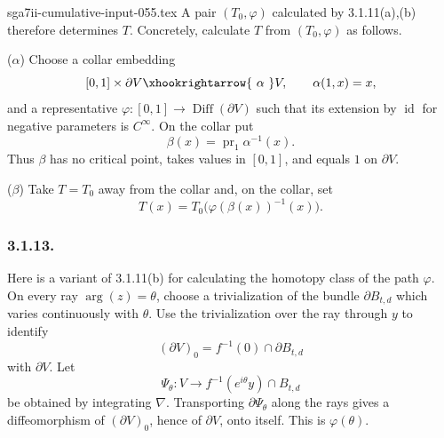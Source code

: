 \begin{filecontents*}{sga7ii-cumulative-input-055.tex}
A pair $(T_0,\varphi)$ calculated by 3.1.11(a),(b) therefore
determines $T$.  Concretely, calculate $T$ from $(T_0,\varphi)$ as
follows.

\medskip
\noindent\textup{($\alpha$)} Choose a collar embedding
  \[
  [0,1]\times\partial V\xhookrightarrow{\ \alpha\ }V,
  \qquad \alpha(1,x)=x,
  \]
  and a representative
  $\varphi:[0,1]\to\operatorname{Diff}(\partial V)$ such that its
  extension by $\operatorname{id}$ for negative parameters is
  $C^\infty$.  On the collar put
  \[
  \beta(x)=\operatorname{pr}_1\alpha^{-1}(x).
  \]
  Thus $\beta$ has no critical point, takes values in $[0,1]$, and
  equals $1$ on $\partial V$.

\medskip
\noindent\textup{($\beta$)} Take $T=T_0$ away from the collar and, on the collar, set
  \[
  T(x)=T_0\bigl(\varphi(\beta(x))^{-1}(x)\bigr).
  \]

\subsubsection*{3.1.13.}
Here is a variant of 3.1.11(b) for calculating the homotopy class of
the path $\varphi$.  On every ray $\arg(z)=\theta$, choose a
trivialization of the bundle $\partial B_{t,d}$ which varies
continuously with $\theta$.  Use the trivialization over the ray
through $y$ to identify
\[
(\partial V)_0=f^{-1}(0)\cap\partial B_{t,d}
\]
with $\partial V$.  Let
\[
\Psi_\theta:V\longrightarrow
f^{-1}(e^{i\theta}y)\cap B_{t,d}
\]
be obtained by integrating $\nabla$.  Transporting
$\partial\Psi_\theta$ along the rays gives a diffeomorphism of
$(\partial V)_0$, hence of $\partial V$, onto itself.  This is
$\varphi(\theta)$.
\end{filecontents*}
